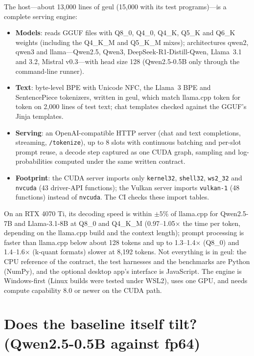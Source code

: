 \documentclass[11pt]{article}
\begin{document}
The host---about 13,000 lines of geul (15,000 with its test programs)---is a complete serving engine:
\begin{itemize}
\item \textbf{Models}: reads GGUF files with Q8\_0, Q4\_0, Q4\_K, Q5\_K and Q6\_K weights (including the Q4\_K\_M and
      Q5\_K\_M mixes); architectures qwen2, qwen3 and llama---Qwen2.5, Qwen3, DeepSeek-R1-Distill-Qwen, Llama~3.1 and 3.2,
      Mistral v0.3---with head size 128 (Qwen2.5-0.5B only through the command-line runner).
\item \textbf{Text}: byte-level BPE with Unicode NFC, the Llama~3 BPE and SentencePiece tokenizers, written in geul, which
      match llama.cpp token for token on 2,000 lines of test text; chat templates checked against the GGUF's Jinja
      templates.
\item \textbf{Serving}: an OpenAI-compatible HTTP server (chat and text completions, streaming, \texttt{/tokenize}), up to 8
      slots with continuous batching and per-slot prompt reuse, a decode step captured as one CUDA graph, sampling and
      log-probabilities computed under the same written contract.
\item \textbf{Footprint}: the CUDA server imports only \texttt{kernel32}, \texttt{shell32}, \texttt{ws2\_32} and
      \texttt{nvcuda} (43 driver-API functions); the Vulkan server imports \texttt{vulkan-1} (48 functions) instead of
      \texttt{nvcuda}. The CI checks these import tables.
\end{itemize}

On an RTX 4070 Ti, its decoding speed is within $\pm5$\% of llama.cpp for Qwen2.5-7B and Llama-3.1-8B at Q8\_0 and
Q4\_K\_M (0.97--1.05$\times$ the time per token, depending on the llama.cpp build and the context length); prompt
processing is faster than llama.cpp below about 128 tokens and up to 1.3--1.4$\times$ (Q8\_0) and 1.4--1.6$\times$ (k-quant
formats) slower at 8,192 tokens. Not everything is in geul: the CPU reference of the contract, the test harnesses and the
benchmarks are Python (NumPy), and the optional desktop app's interface is JavaScript. The engine is Windows-first (Linux
builds were tested under WSL2), uses one GPU, and needs compute capability 8.0 or newer on the CUDA path.

\section{Does the baseline itself tilt? (Qwen2.5-0.5B against fp64)}\label{app:tilt64}
\end{document}
